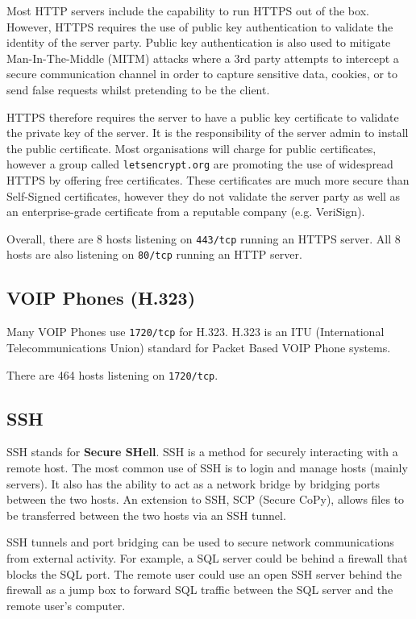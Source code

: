 \documentclass[a4paper]{article}
\begin{document}
Most HTTP servers include the capability to run HTTPS out of the box.
However, HTTPS requires the use of public key authentication to validate the identity of the server party.
Public key authentication is also used to mitigate Man-In-The-Middle (MITM) attacks where a 3rd party attempts to intercept a secure communication channel in order to capture sensitive data, cookies, or to send false requests whilst pretending to be the client.

HTTPS therefore requires the server to have a public key certificate to validate the private key of the server.
It is the responsibility of the server admin to install the public certificate.
Most organisations will charge for public certificates, however a group called \texttt{letsencrypt.org} are promoting the use of widespread HTTPS by offering free certificates.
These certificates are much more secure than Self-Signed certificates, however they do not validate the server party as well as an enterprise-grade certificate from a reputable company (e.g. VeriSign).

Overall, there are 8 hosts listening on \texttt{443/tcp} running an HTTPS server.
All 8 hosts are also listening on \texttt{80/tcp} running an HTTP server.

\subsection{VOIP Phones (H.323)}
Many VOIP Phones use \texttt{1720/tcp} for H.323.
H.323 is an ITU (International Telecommunications Union) standard for Packet Based VOIP Phone systems.

There are 464 hosts listening on \texttt{1720/tcp}.

\subsection{SSH}
SSH stands for \textbf{Secure SHell}.
SSH is a method for securely interacting with a remote host.
The most common use of SSH is to login and manage hosts (mainly servers).
It also has the ability to act as a network bridge by bridging ports between the two hosts.
An extension to SSH, SCP (Secure CoPy), allows files to be transferred between the two hosts via an SSH tunnel.

SSH tunnels and port bridging can be used to secure network communications from external activity.
For example, a SQL server could be behind a firewall that blocks the SQL port.
The remote user could use an open SSH server behind the firewall as a jump box to forward SQL traffic between the SQL server and the remote user's computer.
\end{document}
